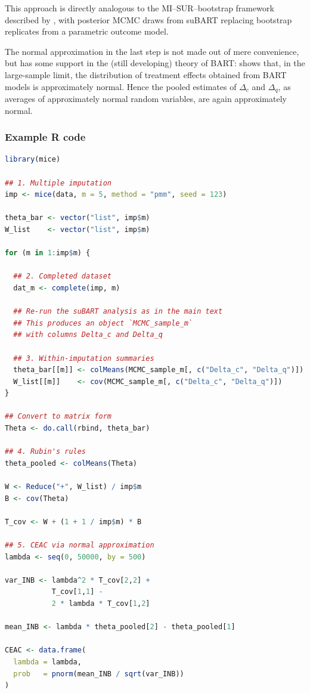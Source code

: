 \documentclass[aoas,preprint]{imsart}
\theoremstyle{plain}
\theoremstyle{definition}
\theoremstyle{remark}
\theoremstyle{remark}
\begin{document}
This approach is directly analogous to the MI--SUR--bootstrap framework described by \citet{ben2023conducting}, with posterior MCMC draws from suBART replacing bootstrap replicates from a parametric outcome model.

The normal approximation in the last step is not made out of mere convenience, but has some support in the (still developing) theory of BART: 
\citet{rockova2020semi} shows that, in the large-sample limit, the distribution of treatment effects obtained from BART models is approximately normal. Hence the pooled estimates of $\Delta_c$ and $\Delta_q$, as averages of approximately normal random variables, are again approximately normal.

\subsubsection{Example R code}
\begin{lstlisting}[language=R, caption={Illustration of combining multiple imputation with suBART using Rubin's rules.}]
library(mice)

## 1. Multiple imputation
imp <- mice(data, m = 5, method = "pmm", seed = 123)

theta_bar <- vector("list", imp$m)
W_list    <- vector("list", imp$m)

for (m in 1:imp$m) {

  ## 2. Completed dataset
  dat_m <- complete(imp, m)

  ## Re-run the suBART analysis as in the main text
  ## This produces an object `MCMC_sample_m`
  ## with columns Delta_c and Delta_q

  ## 3. Within-imputation summaries
  theta_bar[[m]] <- colMeans(MCMC_sample_m[, c("Delta_c", "Delta_q")])
  W_list[[m]]    <- cov(MCMC_sample_m[, c("Delta_c", "Delta_q")])
}

## Convert to matrix form
Theta <- do.call(rbind, theta_bar)

## 4. Rubin's rules
theta_pooled <- colMeans(Theta)

W <- Reduce("+", W_list) / imp$m
B <- cov(Theta)

T_cov <- W + (1 + 1 / imp$m) * B

## 5. CEAC via normal approximation
lambda <- seq(0, 50000, by = 500)

var_INB <- lambda^2 * T_cov[2,2] +
           T_cov[1,1] -
           2 * lambda * T_cov[1,2]

mean_INB <- lambda * theta_pooled[2] - theta_pooled[1]

CEAC <- data.frame(
  lambda = lambda,
  prob   = pnorm(mean_INB / sqrt(var_INB))
)
\end{lstlisting}
\end{document}
